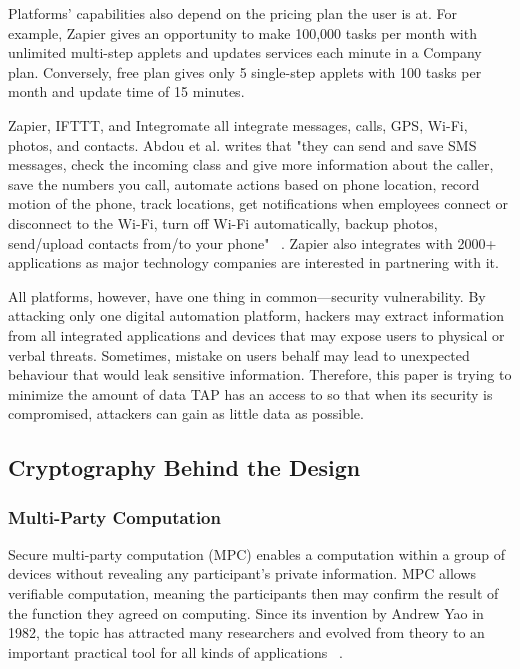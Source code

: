 Platforms' capabilities also depend on the pricing plan the user is at. For example, Zapier gives an
opportunity to make 100,000 tasks per month with unlimited multi-step applets and updates services
each minute in a Company plan. Conversely, free plan gives only 5 single-step applets with 100 tasks
per month and update time of 15 minutes. 

Zapier, IFTTT, and Integromate all integrate messages, calls, GPS, Wi-Fi, photos, and contacts. Abdou
et al. writes that "they can send and save SMS messages, check the incoming class and give more
information about the caller, save the numbers you call, automate actions based on phone location,
record motion of the phone, track locations, get notifications when employees connect or disconnect to
the Wi-Fi, turn off Wi-Fi automatically, backup photos, send/upload contacts from/to your phone"
~\cite{DBLP:conf/icict2/AbdouEF21}. Zapier also integrates with 2000+ applications as major technology
companies are interested in partnering with it. 

All platforms, however, have one thing in common---security vulnerability. By attacking only one digital
automation platform, hackers may extract information from all integrated applications and devices that
may expose users to physical or verbal threats. Sometimes, mistake on users behalf may lead to
unexpected behaviour that would leak sensitive information. Therefore, this paper is trying to minimize
the amount of data TAP has an access to so that when its security is compromised, attackers can gain as
little data as possible.

\subsection{Cryptography Behind the Design}

\subsubsection{Multi-Party Computation}

Secure multi-party computation (MPC) enables a computation within a group of devices without revealing
any participant's private information. MPC allows verifiable computation, meaning the participants then
may confirm the result of the function they agreed on computing. Since its invention by Andrew Yao in
1982, the topic has attracted many researchers and evolved from theory to an important practical tool for
all kinds of applications ~\cite{DBLP:journals/ftsec/EvansKR18}. 

